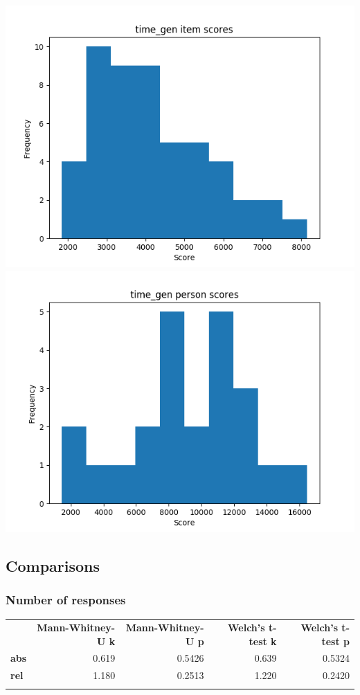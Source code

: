 \documentclass[]{article}
\begin{document}
\includegraphics{time_gen_diff.png} \includegraphics{time_gen_abil.png}

\subsection{Comparisons}\label{comparisons}

\subsubsection{Number of responses}\label{number-of-responses-1}

\begin{longtable}[c]{@{}lrrrr@{}}
\toprule\addlinespace
& \textbf{Mann-Whitney-U k} & \textbf{Mann-Whitney-U p} &
\textbf{Welch's t-test k} & \textbf{Welch's t-test p}
\\\addlinespace
\midrule\endhead
\textbf{abs} & 0.619 & 0.5426 & 0.639 & 0.5324
\\\addlinespace
\textbf{rel} & 1.180 & 0.2513 & 1.220 & 0.2420
\\\addlinespace
\bottomrule
\end{longtable}
\end{document}

